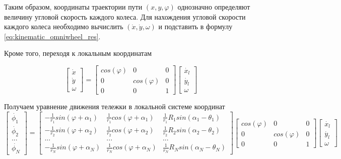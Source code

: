 \documentclass[oneside,final,14pt]{extreport}
\begin{document}
Таким образом, координаты траектории пути $(x,y,\varphi)$ однозначно определяют величину угловой скорость каждого колеса. Для нахождения угловой скорости каждого колеса необходимо вычислить $(\dot{x},\dot{y},\omega)$ и подставить в формулу \ref{eq:kinematic_omniwheel_res}.

\iffalse
Кроме того, переходя к локальным координатам

\begin{equation}
\begin{bmatrix}
\dot{x} \\
\dot{y} \\
\omega
\end{bmatrix}
=
\begin{bmatrix}
cos(\varphi) & 0 & 0 \\
0 & cos(\varphi) & 0 \\
0 & 0 & 1
\end{bmatrix}
\begin{bmatrix}
\dot{x_{l}} \\
\dot{y_{l}} \\
\omega
\end{bmatrix}
\end{equation}

Получаем уравнение движения тележки в локальной системе координат
\begin{equation}
\begin{bmatrix}
\dot{\phi_{1}} \\
\dot{\phi_{2}} \\
...\\
\dot{\phi_{N}}
\end{bmatrix}
=
\begin{bmatrix}
-\frac{1}{r_{1}}sin(\varphi +\alpha_{1}) &
\frac{1}{r_{1}}cos(\varphi +\alpha_{1}) &
\frac{1}{r_{1}}R_{1}sin(\alpha_{1} - \theta_{1})
\\
-\frac{1}{r_{2}}sin(\varphi +\alpha_{2}) &
\frac{1}{r_{2}}cos(\varphi +\alpha_{2}) &
\frac{1}{r_{2}}R_{2}sin(\alpha_{2} - \theta_{2})
\\
... & ... & ...
\\
-\frac{1}{r_{N}}sin(\varphi +\alpha_{N}) &
\frac{1}{r_{N}}cos(\varphi +\alpha_{N}) &
\frac{1}{r_{N}}R_{N}sin(\alpha_{N} - \theta_{N})
\end{bmatrix}
\begin{bmatrix}
cos(\varphi) & 0 & 0 \\
0 & cos(\varphi) & 0 \\
0 & 0 & 1
\end{bmatrix}
\begin{bmatrix}
\dot{x_{l}} \\
\dot{y_{l}} \\
\omega
\end{bmatrix}
\end{equation}
\end{document}
